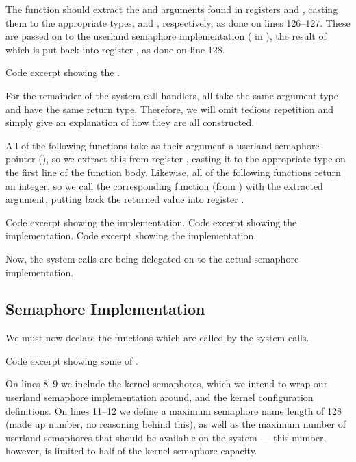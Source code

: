 The  function should extract the 
and  arguments found in registers  and , casting
them to the appropriate types,  and ,
respectively, as done on lines 126--127. These are passed on to the userland
semaphore implementation ( in
), the result of which is put back into register
, as done on line 128.

{Code excerpt showing the .}

For the remainder of the system call handlers, all take the same argument type
and have the same return type. Therefore, we will omit tedious repetition and
simply give an explanation of how they are all constructed.

All of the following functions take as their argument a userland semaphore
pointer (), so we extract this from register ,
casting it to the appropriate type on the first line of the function body.
Likewise, all of the following functions return an integer, so we call the
corresponding function (from ) with the extracted
argument, putting back the returned value into register .

{Code excerpt showing the  implementation.}
{Code excerpt showing the  implementation.}
{Code excerpt showing the  implementation.}

Now, the system calls are being delegated on to the actual semaphore
implementation.

\subsection{Semaphore Implementation}
We must now declare the functions which are called by the system calls.

{Code excerpt showing some of .}

On lines 8--9 we include the kernel semaphores, which we intend to wrap our
userland semaphore implementation around, and the kernel configuration
definitions. On lines 11--12 we define a maximum semaphore name length of
128 (made up number, no reasoning behind this), as well as the maximum number
of userland semaphores that should be available on the system --- this number,
however, is limited to half of the kernel semaphore capacity.


